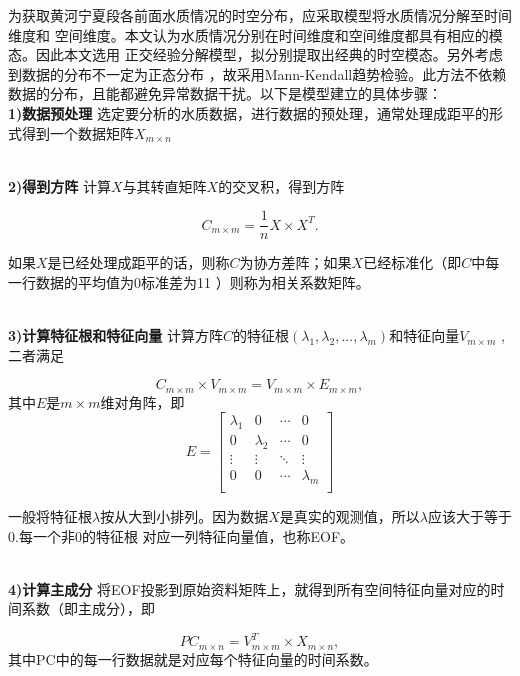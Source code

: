 \documentclass{whutmod}
\begin{document}
\begin{spacing}{1.2}
为获取黄河宁夏段各前面水质情况的时空分布，应采取模型将水质情况分解至时间维度和
空间维度。本文认为水质情况分别在时间维度和空间维度都具有相应的模态。因此本文选用
正交经验分解模型，拟分别提取出经典的时空模态。另外考虑到数据的分布不一定为正态分布
，故采用Mann-Kendall趋势检验。此方法不依赖数据的分布，且能都避免异常数据干扰。以下是模型建立的具体步骤：
~\\
\textbf{1)数据预处理}
选定要分析的水质数据，进行数据的预处理，通常处理成距平的形式得到一个数据矩阵$X_{m\times n}$

~\\
\textbf{2)得到方阵}
计算$X$与其转直矩阵$X$的交叉积，得到方阵
 
\begin{equation}\label{eq:dirchlet}
      C_{m\times m}=\frac{1}{n}X\times X^T .
\end{equation}

如果$X$是已经处理成距平的话，则称$C$为协方差阵；如果$X$已经标准化（即$C$中每一行数据的平均值为0标准差为11
）则称为相关系数矩阵。

~\\
\textbf{3)计算特征根和特征向量}
计算方阵$C$的特征根$ (\lambda_{1} ,\lambda_{2} ,...,\lambda_{m}) $和特征向量$V_{m\times m}$
,二者满足

\begin{equation}\label{eq:dirchlet}
	C_{m\times m}\times V_{m\times m}=V_{m\times m}\times E_{m\times m},
\end{equation}
其中$E$是$m\times m$维对角阵，即
$$E=\begin{bmatrix}
	\lambda_{1} & 0 & \cdots & 0\\
	 0 & \lambda_{2}& \cdots & 0\\
	 \vdots &\vdots & \ddots &\vdots \\
	 0 & 0 & \cdots & \lambda_{m}\\
\end{bmatrix}$$

一般将特征根$\lambda$按从大到小排列。因为数据$X$是真实的观测值，所以$\lambda$应该大于等于0.每一个非0的特征根
对应一列特征向量值，也称EOF。


~\\
\textbf{4)计算主成分}
将EOF投影到原始资料矩阵上，就得到所有空间特征向量对应的时间系数（即主成分），即

\begin{equation}\label{eq:dirchlet}
     PC_{m\times n}=V_{m\times m}^T \times X_{m\times n},
\end{equation}
其中PC中的每一行数据就是对应每个特征向量的时间系数。


\end{spacing}
\end{document}

